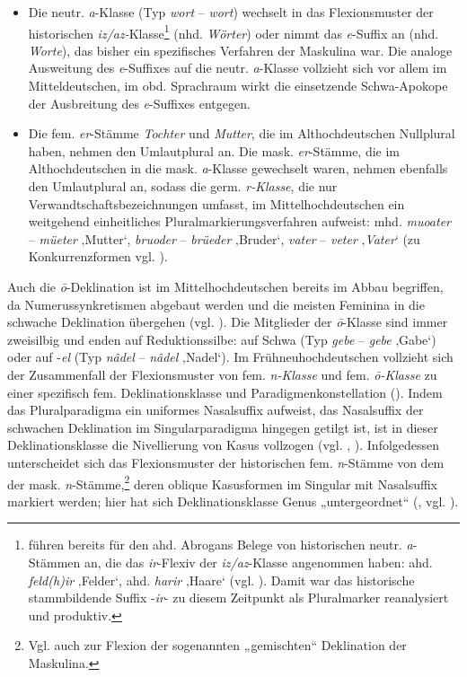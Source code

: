 \begin{itemize}
\item Die neutr. \textit{a}{}-Klasse (Typ \textit{wort} -- \textit{wort}) wechselt in das Flexionsmuster der historischen \textit{iz/az-}Klasse\footnote{\citet[153]{KleinEtAl2018} führen bereits für den ahd. Abrogans Belege von historischen neutr. \textit{a}{}-Stämmen an, die das \textit{ir}{}-Flexiv der \textit{iz/az}{}-Klasse angenommen haben: ahd. \textit{feld(h)ir} ‚Felder‘, ahd. \textit{harir} ‚Haare‘ (vgl. \citealt[293]{Nübling2008}). Damit war das historische stammbildende Suffix -\textit{ir}{}- zu diesem Zeitpunkt als Pluralmarker reanalysiert und produktiv.}  (nhd. \textit{Wörter}) oder nimmt das \textit{e}{}-Suffix an (nhd. \textit{Worte}), das bisher ein spezifisches Verfahren der Maskulina war. Die analoge Ausweitung des \textit{e}{}-Suffixes auf die neutr. \textit{a}{}-Klasse vollzieht sich vor allem im Mitteldeutschen, im obd. Sprachraum wirkt die einsetzende Schwa-Apokope der Ausbreitung des \textit{e}{}-Suffixes entgegen.
\item Die fem. \textit{er}{}-Stämme \textit{Tochter} und \textit{Mutter}, die im Althochdeutschen Nullplural haben, nehmen den Umlautplural an. Die mask. \textit{er}{}-Stämme, die im Althochdeutschen in die mask. \textit{a}{}-Klasse gewechselt waren, nehmen ebenfalls den Umlautplural an, sodass die germ. {\textit{r}}\textit{{}-Klasse}, die nur Verwandtschaftsbezeichnungen umfasst, im Mittelhochdeutschen ein weitgehend einheitliches Pluralmarkierungsverfahren aufweist: mhd. \textit{muoater} -- \textit{müeter} ‚Mutter‘, \textit{bruoder} -- \textit{brüeder} ‚Bruder‘, \textit{vater} -- \textit{veter} ‚\textit{Vater}‘ (zu Konkurrenzformen vgl. \citealt[137--138]{KleinEtAl2018}).
\end{itemize}

Auch die \textit{ō}{}-Deklination ist im Mittelhochdeutschen bereits im Abbau begriffen, da Numerussynkretismen abgebaut werden und die meisten Feminina in die schwache Deklination übergehen (vgl. \citealt[89]{Kürschner2008a}). Die Mitglieder der \textit{ō}{}-Klasse sind immer zweisilbig und enden auf Reduktionssilbe: auf Schwa (Typ \textit{gebe} -- \textit{gebe} ‚Gabe‘) oder auf -\textit{el} (Typ \textit{nâdel} -- \textit{nâdel} ‚Nadel‘). Im Frühneuhochdeutschen vollzieht sich der Zusammenfall der Flexionsmuster von fem. \textit{\textit{n}}\textit{{}-Klasse} und fem. \textit{\textit{ō}}\textit{{}-Klasse} zu einer spezifisch fem. Deklinationsklasse und Paradigmenkonstellation (). Indem das Pluralparadigma ein uniformes Nasalsuffix aufweist, das Nasalsuffix der schwachen Deklination im Singularparadigma hingegen getilgt ist, ist in dieser Deklinationsklasse die Nivellierung von Kasus vollzogen (vgl. \citealt[204--206]{DammelGillmann2014}, \citealt[110]{KleinEtAl2018}). Infolgedessen unterscheidet sich das Flexionsmuster der historischen fem. \textit{n}{}-Stämme von dem der mask. \textit{n}{}-Stämme,\footnote{Vgl. auch  zur Flexion der sogenannten „gemischten“ Deklination der Maskulina.} deren oblique Kasusformen im Singular mit Nasalsuffix markiert werden; hier hat sich Deklinationsklasse Genus „untergeordnet“ (\citealt[303]{Nübling2008}, vgl. \citealt{Bittner1994, Bittner2000}).


